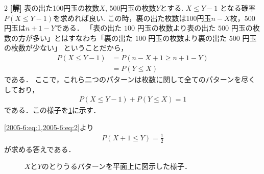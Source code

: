 \documentclass[../../../../main.tex]{subfiles}
\begin{document}
\setcounter{equation}{0}
\begin{oframed}
  
\end{oframed}
\setlength{\columnseprule}{0.4pt}
\begin{multicols}{2}
  {\bf[解]}
  表の出た100円玉の枚数$X$, 500円玉の枚数$Y$とする.
  $X \le Y-1$ となる確率$P(X \le Y-1)$を求めれば良い.
  この時，裏の出た枚数は100円玉$n-X$枚，500円玉は$n+1-Y$である．
  「表の出た $100$ 円玉の枚数より表の出た $500$ 円玉の枚
  数の方が多い」とはすなわち「裏の出た $100$ 円玉の枚数より裏の出た $500$ 円玉の枚数が少ない」
  ということだから，
  \begin{align}
    P(X \le Y-1)
     & = P(n-X+1 \ge n+1-Y)             \\
     & = P(Y \le X) \label{2005-6:eq:1}
  \end{align}
  である．
  ここで，これら二つのパターンは枚数に関して全てのパターンを尽くしており，
  \begin{align}
    P(X \le Y-1) + P(Y \le X) = 1 \label{2005-6:eq:2}
  \end{align}
  である．この様子を\cref{2005-6:fig:1}に示す．

  \cref{2005-6:eq:1,2005-6:eq:2}より
  \begin{align*}
    P(X+1 \le Y) = \frac{1}{2}
  \end{align*}
  が求める答えである．

  \begin{figure}[H]
    \centering
    \caption{$X$と$Y$のとりうるパターンを平面上に図示した様子．}
    \label{2005-6:fig:1}
\end{figure}
\end{multicols}
\end{document}
